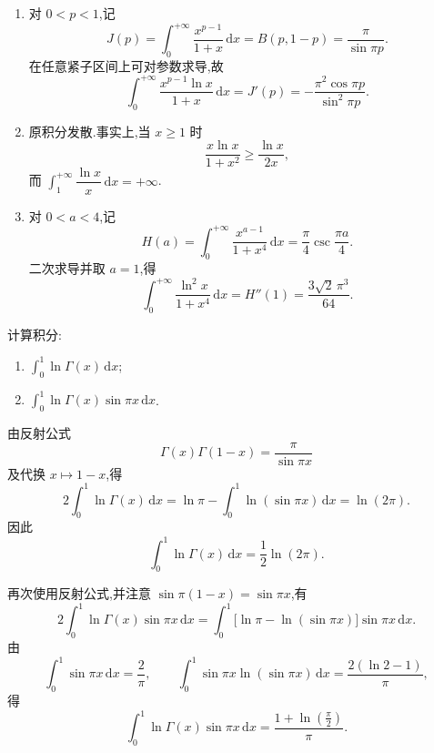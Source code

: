 \begin{solution}
    \begin{enumerate}
        \item 对 $0<p<1$,记
              \[
                  J(p)=\int_0^{+\infty}\dfrac{x^{p-1}}{1+x}\,\mathrm{d}x
                  =B(p,1-p)=\dfrac{\pi}{\sin\pi p}.
              \]
              在任意紧子区间上可对参数求导,故
              \[
                  \int_0^{+\infty}\dfrac{x^{p-1}\ln x}{1+x}\,\mathrm{d}x
                  =J'(p)=-\dfrac{\pi^2\cos\pi p}{\sin^2\pi p}.
              \]
        \item 原积分发散.事实上,当 $x\geq1$ 时
              \[
                  \dfrac{x\ln x}{1+x^2}\geq\dfrac{\ln x}{2x},
              \]
              而 $\displaystyle\int_1^{+\infty}\dfrac{\ln x}{x}\,\mathrm{d}x=+\infty$.
        \item 对 $0<a<4$,记
              \[
                  H(a)=\int_0^{+\infty}\dfrac{x^{a-1}}{1+x^4}\,\mathrm{d}x
                  =\dfrac{\pi}{4}\csc\dfrac{\pi a}{4}.
              \]
              二次求导并取 $a=1$,得
              \[
                  \int_0^{+\infty}\dfrac{\ln^2x}{1+x^4}\,\mathrm{d}x
                  =H''(1)=\dfrac{3\sqrt2\,\pi^3}{64}.
              \]
    \end{enumerate}
\end{solution}

\begin{example}
    计算积分:
    \begin{enumerate}
        \item $\displaystyle\int_0^1\ln\Gamma(x)\,\mathrm{d}x$;
        \item $\displaystyle\int_0^1\ln\Gamma(x)\sin\pi x\,\mathrm{d}x$.
    \end{enumerate}
\end{example}
\exampleblank

\begin{solution}
    由反射公式
    \[
        \Gamma(x)\Gamma(1-x)=\dfrac{\pi}{\sin\pi x}
    \]
    及代换 $x\mapsto1-x$,得
    \[
        2\int_0^1\ln\Gamma(x)\,\mathrm{d}x
        =\ln\pi-\int_0^1\ln(\sin\pi x)\,\mathrm{d}x
        =\ln(2\pi).
    \]
    因此
    \[
        \int_0^1\ln\Gamma(x)\,\mathrm{d}x=\dfrac{1}{2}\ln(2\pi).
    \]

    再次使用反射公式,并注意 $\sin\pi(1-x)=\sin\pi x$,有
    \[
        2\int_0^1\ln\Gamma(x)\sin\pi x\,\mathrm{d}x
        =\int_0^1\bigl[\ln\pi-\ln(\sin\pi x)\bigr]\sin\pi x\,\mathrm{d}x.
    \]
    由
    \[
        \int_0^1\sin\pi x\,\mathrm{d}x=\dfrac{2}{\pi},
        \qquad
        \int_0^1\sin\pi x\ln(\sin\pi x)\,\mathrm{d}x
        =\dfrac{2(\ln2-1)}{\pi},
    \]
    得
    \[
        \int_0^1\ln\Gamma(x)\sin\pi x\,\mathrm{d}x
        =\dfrac{1+\ln\left(\frac{\pi}{2}\right)}{\pi}.
    \]
\end{solution}

